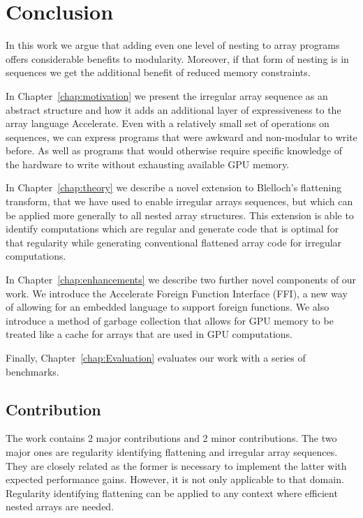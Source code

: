 \chapter{Conclusion}

In this work we argue that adding even one level of nesting to array programs offers considerable benefits to modularity. Moreover, if that form of nesting is in sequences we get the additional benefit of reduced memory constraints.

In Chapter~\ref{chap:motivation} we present the irregular array sequence as an abstract structure and how it adds an additional layer of expressiveness to the array language Accelerate. Even with a relatively small set of operations on sequences, we can express programs that were awkward and non-modular to write before. As well as programs that would otherwise require specific knowledge of the hardware to write without exhausting available GPU memory.

In Chapter~\ref{chap:theory} we describe a novel extension to Blelloch's flattening transform, that we have used to enable irregular arrays sequences, but which can be applied more generally to all nested array structures. This extension is able to identify computations which are regular and generate code that is optimal for that regularity while generating conventional flattened array code for irregular computations.

In Chapter~\ref{chap:enhancements} we describe two further novel components of our work. We introduce the Accelerate Foreign Function Interface (FFI), a new way of allowing for an embedded language to support foreign functions. We also introduce a method of garbage collection that allows for GPU memory to be treated like a cache for arrays that are used in GPU computations.

Finally, Chapter~\ref{chap:Evaluation} evaluates our work with a series of benchmarks.

\section{Contribution}

The work contains 2 major contributions and 2 minor contributions. The two major ones are regularity identifying flattening and irregular array sequences. They are closely related as the former is necessary to implement the latter with expected performance gains. However, it is not only applicable to that domain. Regularity identifying flattening can be applied to any context where efficient nested arrays are needed.

